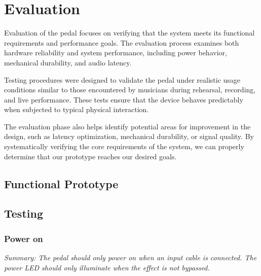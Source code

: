 \documentclass[12pt]{article}
\begin{document}
\section{Evaluation}
Evaluation of the pedal focuses on verifying that the system meets its functional requirements and performance goals. The evaluation process examines both hardware reliability and system performance, including power behavior, mechanical durability, and audio latency.

Testing procedures were designed to validate the pedal under realistic usage conditions similar to those encountered by musicians during rehearsal, recording, and live performance. These tests ensure that the device behaves predictably when subjected to typical physical interaction.

The evaluation phase also helps identify potential areas for improvement in the design, such as latency optimization, mechanical durability, or signal quality. By systematically verifying the core requirements of the system, we can properly determine that our prototype reaches our desired goals.
\subsection{Functional Prototype}

\subsection{Testing} 

\subsubsection{Power on}

\textit{Summary: The pedal should only power on when an input cable is connected. The power LED should only illuminate when the effect is not bypassed.}\\
\end{document}
